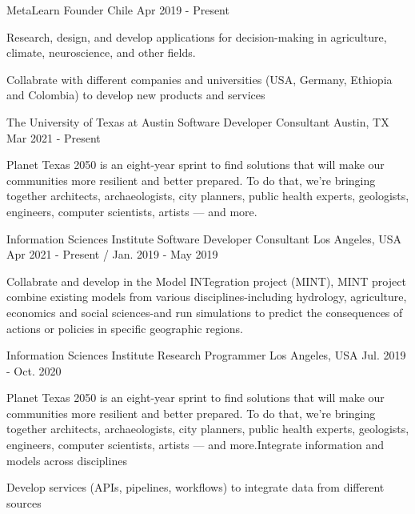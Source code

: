 \begin{cventries}

  \cventry
    {MetaLearn}
    {Founder}
    {Chile}
    {Apr 2019 - Present}
    {
      \begin{cvitems}
        \item{Research, design, and develop applications for decision-making in agriculture, climate, neuroscience, and other fields.}
        \item{Collabrate with different companies and universities (USA, Germany, Ethiopia and Colombia) to develop new products and services}
      \end{cvitems}
    }

  \cventry
    {The University of Texas at Austin}
    {Software Developer Consultant}
    {Austin, TX}
    {Mar 2021 - Present}
    {
      \begin{cvitems}
        \item{Planet Texas 2050 is an eight-year sprint to find solutions that will make our communities more resilient and better prepared. To do that, we’re bringing together architects, archaeologists, city planners, public health experts, geologists, engineers, computer scientists, artists — and more.}
      \end{cvitems}
    }

  \cventry
    {Information Sciences Institute}
    {Software Developer Consultant}
    {Los Angeles, USA}
    {Apr 2021 - Present / Jan. 2019 - May 2019}
    {
      \begin{cvitems}
        \item{Collabrate and develop in the Model INTegration project (MINT), MINT project combine existing models from various disciplines-including hydrology, agriculture, economics and social sciences-and run simulations to predict the consequences of actions or policies in specific geographic regions.}
      \end{cvitems}
    }

  \cventry
    {Information Sciences Institute}
    {Research Programmer}
    {Los Angeles, USA}
    {Jul. 2019 - Oct. 2020}
    {
      \begin{cvitems}
        \item {Planet Texas 2050 is an eight-year sprint to find solutions that will make our communities more resilient and better prepared. To do that, we’re bringing together architects, archaeologists, city planners, public health experts, geologists, engineers, computer scientists, artists — and more.Integrate information and models across disciplines}
        \item {Develop services (APIs, pipelines, workflows) to integrate data from different sources}
      \end{cvitems}
    }
    

\end{cventries}
